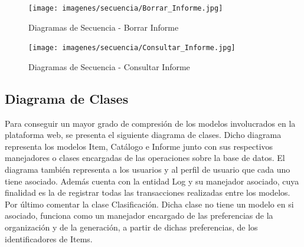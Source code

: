 \documentclass[a4paper,11pt]{book}
\begin{document}
\begin{figure}[H] 
\centering 
\texttt{[image: imagenes/secuencia/Borrar\_Informe.jpg]}
\caption{ Diagramas de Secuencia - Borrar Informe\cite{diagrama}  }  
\end{figure}

\begin{figure}[H] 
\centering 
\texttt{[image: imagenes/secuencia/Consultar\_Informe.jpg]}
\caption{ Diagramas de Secuencia - Consultar Informe\cite{diagrama}  }  
\end{figure}

\subsection{Diagrama de Clases}

Para conseguir un mayor grado de compresión de los modelos involucrados en la plataforma web, se presenta el siguiente diagrama de clases. Dicho diagrama representa los modelos Item, Catálogo e Informe junto con sus respectivos manejadores o clases encargadas de las operaciones sobre la base de datos. El diagrama también representa a los usuarios y al perfil de usuario que cada uno tiene asociado.  Además cuenta con la entidad Log y su manejador asociado, cuya finalidad es la de registrar todas las transacciones realizadas entre los modelos. Por último comentar la clase Clasificación. Dicha clase no tiene un modelo en si asociado, funciona como un manejador encargado de las preferencias de la organización y de la generación, a partir de dichas preferencias, de los identificadores de Items. 
\end{document}
